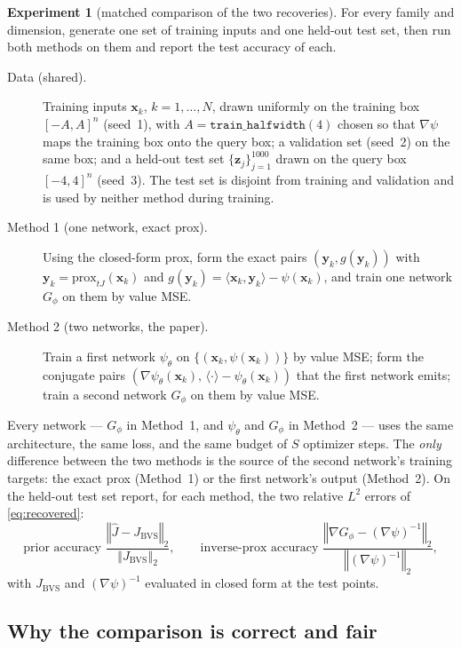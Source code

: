 \documentclass[11pt]{article}
\theoremstyle{definition}
\newtheorem{experiment}{Experiment}
\theoremstyle{remark}
\newcommand{\norm}[1]{\left\Vert{#1} \right\Vert}
\def\bx {\boldsymbol{x}}
\def\by {\boldsymbol{y}}
\def\bz {\boldsymbol{z}}
\def\JBVS {J_{\text{BVS}}}
\def\prox {\mathrm{prox}}
\def\psiNN {\psi_{\theta}}
\def\GNN {G_{\phi}}
\begin{document}
\begin{experiment}[matched comparison of the two recoveries]
\label{exp:cmp}
For every family and dimension, generate one set of training inputs and one held-out test set, then run both methods on them and report the test accuracy of each.
\begin{description}
\item[Data (shared).] Training inputs $\bx_{k}$, $k = 1,\dots,N$, drawn uniformly on the training box $[-A,A]^{n}$ (seed~1), with $A = \texttt{train\_halfwidth}(4)$ chosen so that $\nabla\psi$ maps the training box onto the query box; a validation set (seed~2) on the same box; and a held-out test set $\{\bz_{j}\}_{j=1}^{1000}$ drawn on the query box $[-4,4]^{n}$ (seed~3).
The test set is disjoint from training and validation and is used by neither method during training.
\item[Method 1 (one network, exact prox).] Using the closed-form prox, form the exact pairs $(\by_{k}, g(\by_{k}))$ with $\by_{k} = \prox_{tJ}(\bx_{k})$ and $g(\by_{k}) = \langle\bx_{k},\by_{k}\rangle - \psi(\bx_{k})$, and train one network $\GNN$ on them by value MSE.
\item[Method 2 (two networks, the paper).] Train a first network $\psiNN$ on $\{(\bx_{k}, \psi(\bx_{k}))\}$ by value MSE; form the conjugate pairs $(\nabla\psiNN(\bx_{k}),\, \langle\cdot\rangle - \psiNN(\bx_{k}))$ that the first network emits; train a second network $\GNN$ on them by value MSE.
\end{description}
Every network --- $\GNN$ in Method~1, and $\psiNN$ and $\GNN$ in Method~2 --- uses the same architecture, the same loss, and the same budget of $S$ optimizer steps.
The \emph{only} difference between the two methods is the source of the second network's training targets: the exact prox (Method~1) or the first network's output (Method~2).
On the held-out test set report, for each method, the two relative $L^{2}$ errors of \cref{eq:recovered}:
\begin{equation}
\label{eq:acc}
\text{prior accuracy } \frac{\norm{\hat{J} - \JBVS}_{2}}{\norm{\JBVS}_{2}}, \qquad
\text{inverse-prox accuracy } \frac{\norm{\nabla\GNN - (\nabla\psi)^{-1}}_{2}}{\norm{(\nabla\psi)^{-1}}_{2}},
\end{equation}
with $\JBVS$ and $(\nabla\psi)^{-1}$ evaluated in closed form at the test points.
\end{experiment}

\subsection{Why the comparison is correct and fair}
\label{sub:fair}
\end{document}
